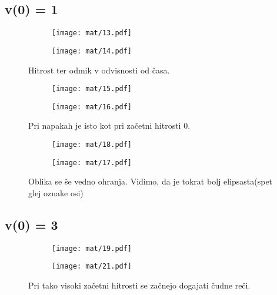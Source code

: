 \documentclass{article}
\begin{document}
\subsection{v(0) = 1}

\begin{figure}[H]
\begin{subfigure}{.5\textwidth}
\texttt{[image: mat/13.pdf]}
\end{subfigure}
\begin{subfigure}{.5\textwidth}
\texttt{[image: mat/14.pdf]}
\end{subfigure}
\caption*{Hitrost ter odmik v odvisnosti od časa.}
\end{figure}

\begin{figure}[H]
\begin{subfigure}{.5\textwidth}
\texttt{[image: mat/15.pdf]}
\end{subfigure}
\begin{subfigure}{.5\textwidth}
\texttt{[image: mat/16.pdf]}
\end{subfigure}
\caption*{Pri napakah je isto kot pri začetni hitrosti 0.}
\end{figure}

\begin{figure}[H]
\begin{subfigure}{.5\textwidth}
\texttt{[image: mat/18.pdf]}
\end{subfigure}
\begin{subfigure}{.5\textwidth}
\texttt{[image: mat/17.pdf]}
\end{subfigure}
\caption*{Oblika se še vedno ohranja. Vidimo, da je tokrat bolj elipsasta(spet glej oznake osi)}
\end{figure}

\subsection{v(0) = 3}

\begin{figure}[H]
\begin{subfigure}{.5\textwidth}
\texttt{[image: mat/19.pdf]}
\end{subfigure}
\begin{subfigure}{.5\textwidth}
\texttt{[image: mat/21.pdf]}
\end{subfigure}
\caption*{Pri tako visoki začetni hitrosti se začnejo dogajati čudne reči.}
\end{figure}
\end{document}
